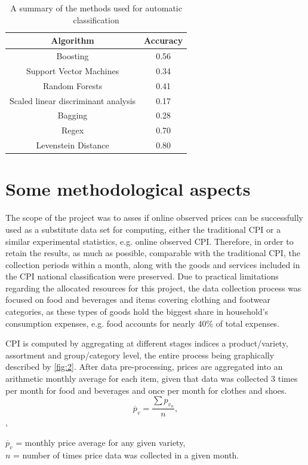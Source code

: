 \documentclass[]{article}
\begin{document}
\begin{table}[h!]
\centering
\begin{tabular}{| c| c| }
	\hline
	Algorithm & Accuracy \\
	\hline  
	Boosting & 0.56 \\  
	Support Vector Machines & 0.34 \\
	Random Forests &  0.41 \\
	Scaled linear discriminant analysis & 0.17 \\
	Bagging & 0.28 \\
	Regex & 0.70 \\
	Levenstein Distance & 0.80 \\
	\hline
\end{tabular}
\caption{A summary of the methods used for automatic classification}
\label{table:1}
\end{table}

\section{Some methodological aspects}\label{methodology}

The scope of the project was to asses if online observed prices can be successfully used as a substitute data set for computing, either the traditional CPI or a similar experimental statistics, e.g. online observed CPI. Therefore, in order to retain the results, as much as possible, comparable with the traditional CPI, the collection periods within a month, 
along with the goods and services included in the CPI national classification were preserved. Due to practical limitations regarding the allocated resources for this project, the data collection process was focused on food and beverages and items covering clothing and footwear categories, as these types of goods 
hold the biggest share in household's consumption expenses, e.g. food accounts for nearly 40\% of total expenses\cite{hhs}. 

CPI is computed by aggregating at different stages indices a product/variety, assortment and group/category level, the entire process being graphically described by \ref{fig:2}. After data pre-processing, prices are aggregated into an arithmetic 
monthly average for each item, given that data was collected 3 times per month for food and beverages and once per month for clothes and shoes. 
\begin{equation}\label{eq:1}
\overline{p}_{v} = \frac{\sum{p_{v_{n}}}}{n} ,
\end{equation} ,
\begin{center} 
	$\overline{p}_{v}$ = monthly price average for any given variety, \\
	$n$ = number of times price data was collected in a given month. \\
\end{center}
\end{document}
